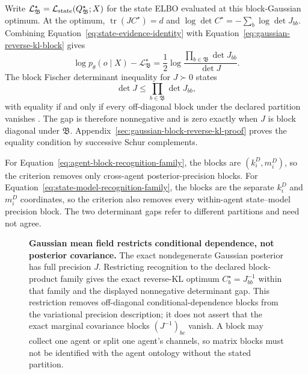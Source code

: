 Write \(\mathcal L_{\mathfrak B}^\star=\mathcal L_{\mathrm{state}}(Q_{\mathfrak B}^\star;X)\) for the state ELBO evaluated at this block-Gaussian optimum. At the optimum, \(\operatorname{tr}(JC^\star)=d\) and \(\log\det C^\star=-\sum_b\log\det J_{bb}\). Combining Equation~\eqref{eq:state-evidence-identity} with Equation~\eqref{eq:gaussian-reverse-kl-block} gives
\begin{equation}
\log p_\theta(o\mid X)-\mathcal L_{\mathfrak B}^\star
=\frac12\log
\frac{\displaystyle\prod_{b\in\mathfrak B}\det J_{bb}}
{\det J}.
\label{eq:gaussian-mean-field-evidence-gap}
\end{equation}
The block Fischer determinant inequality for \(J\succ0\) states
\begin{equation}
\det J\leq\prod_{b\in\mathfrak B}\det J_{bb},
\label{eq:block-fischer-determinant-inequality}
\end{equation}
with equality if and only if every off-diagonal block under the declared partition vanishes \citep{HornJohnson2013}. The gap is therefore nonnegative and is zero exactly when \(J\) is block diagonal under \(\mathfrak B\). Appendix~\ref{sec:gaussian-block-reverse-kl-proof} proves the equality condition by successive Schur complements.

For Equation~\eqref{eq:agent-block-recognition-family}, the blocks are \((k_i^D,m_i^D)\), so the criterion removes only cross-agent posterior-precision blocks. For Equation~\eqref{eq:state-model-recognition-family}, the blocks are the separate \(k_i^D\) and \(m_i^D\) coordinates, so the criterion also removes every within-agent state--model precision block. The two determinant gaps refer to different partitions and need not agree.

\begin{figure}[tbp]
\centering

\caption{\textbf{Gaussian mean field restricts conditional dependence, not posterior covariance.} The exact nondegenerate Gaussian posterior has full precision \(J\). Restricting recognition to the declared block-product family gives the exact reverse-KL optimum \(C_b^\star=J_{bb}^{-1}\) within that family and the displayed nonnegative determinant gap. This restriction removes off-diagonal conditional-dependence blocks from the variational precision description; it does not assert that the exact marginal covariance blocks \((J^{-1})_{bc}\) vanish. A block may collect one agent or split one agent's channels, so matrix blocks must not be identified with the agent ontology without the stated partition.}
\label{fig:magent-precision-mean-field}
\end{figure}

